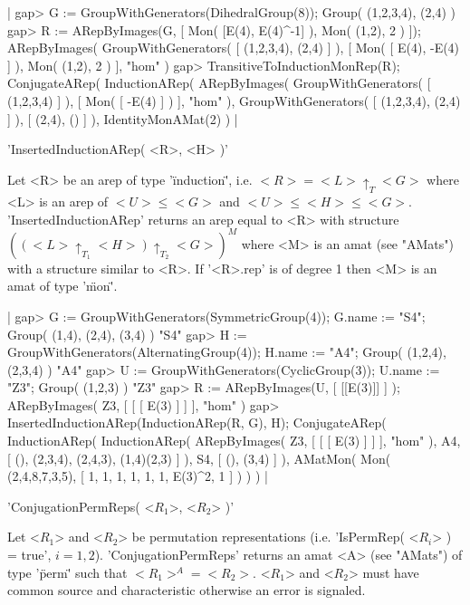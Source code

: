 |    gap> G := GroupWithGenerators(DihedralGroup(8));
    Group( (1,2,3,4), (2,4) )
    gap> R := ARepByImages(G, [ Mon( [E(4), E(4)^-1] ), Mon( (1,2), 2 ) ]);
    ARepByImages(
      GroupWithGenerators( [ (1,2,3,4), (2,4) ] ),
      [ Mon( [ E(4), -E(4) ] ), Mon( (1,2), 2 ) ],
      "hom"
    )
    gap> TransitiveToInductionMonRep(R);
    ConjugateARep(
      InductionARep(
        ARepByImages(
          GroupWithGenerators( [ (1,2,3,4) ] ),
          [ Mon( [ -E(4) ] ) ],
          "hom"
        ),
        GroupWithGenerators( [ (1,2,3,4), (2,4) ] ),
        [ (2,4), () ]
      ),
      IdentityMonAMat(2)
    ) |


'InsertedInductionARep( <R>, <H> )'

Let <R> be an arep of type '\"induction\"', i.e.
$<R> = <L>\uparrow_T <G>$ where <L> is an arep of $<U> \leq <G>$
and $<U> \leq <H> \leq <G>$.
'InsertedInductionARep' returns an arep equal to <R>
with structure $\left( (<L>\uparrow_{T_1}<H>)\uparrow_{T_2}<G>\right)^M$
where <M> is an amat (see "AMats") with a structure similar to <R>. 
If '<R>.rep' is of degree 1 then <M> is an amat of type '\"mon\"'.

|    gap> G := GroupWithGenerators(SymmetricGroup(4)); G.name := "S4";
    Group( (1,4), (2,4), (3,4) )
    "S4"
    gap> H := GroupWithGenerators(AlternatingGroup(4)); H.name := "A4";
    Group( (1,2,4), (2,3,4) )
    "A4"
    gap> U := GroupWithGenerators(CyclicGroup(3)); U.name := "Z3";
    Group( (1,2,3) )
    "Z3"
    gap> R := ARepByImages(U, [ [[E(3)]] ] );
    ARepByImages(
      Z3,
      [ [ [ E(3) ] ]
      ],
      "hom"
    )
    gap> InsertedInductionARep(InductionARep(R, G), H);
    ConjugateARep(
      InductionARep(
        InductionARep(
          ARepByImages(
            Z3,
            [ [ [ E(3) ] ] ],
            "hom"
          ),
          A4,
          [ (), (2,3,4), (2,4,3), (1,4)(2,3) ]
        ),
        S4,
        [ (), (3,4) ]
      ),
      AMatMon( Mon(
        (2,4,8,7,3,5),
        [ 1, 1, 1, 1, 1, 1, E(3)^2, 1 ]
      ) )
    ) |


'ConjugationPermReps( <$R_1$>, <$R_2$> )'

Let <$R_1$> and <$R_2$> be permutation representations (i.e. 
'IsPermRep( <$R_i$> ) = true', $i = 1,2$).
'ConjugationPermReps' returns an amat <A>
(see "AMats") of type '\"perm\"' such that $<R_1>^A = <R_2>$.
<$R_1$> and <$R_2$> must have common source and characteristic 
otherwise an error is signaled.

